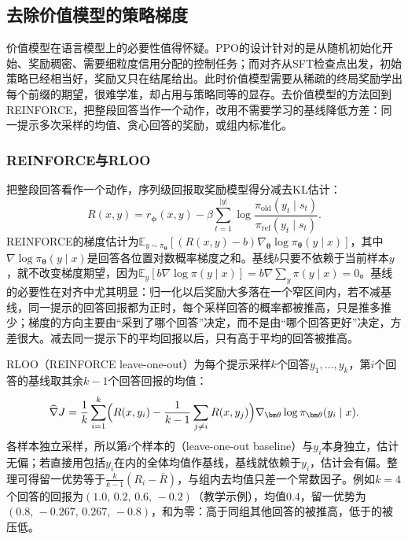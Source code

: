 \subsection{去除价值模型的策略梯度}
\label{sec:nlp-align-critic-free}

价值模型在语言模型上的必要性值得怀疑。PPO的设计针对的是从随机初始化开始、奖励稠密、需要细粒度信用分配的控制任务；而对齐从SFT检查点出发，初始策略已经相当好，奖励又只在结尾给出。此时价值模型需要从稀疏的终局奖励学出每个前缀的期望，很难学准，却占用与策略同等的显存。去价值模型的方法回到REINFORCE，把整段回答当作一个动作，改用不需要学习的基线降低方差：同一提示多次采样的均值、贪心回答的奖励，或组内标准化。

\subsubsection{REINFORCE与RLOO}
\label{sec:nlp-align-rloo}

把整段回答看作一个动作，序列级回报取奖励模型得分减去KL估计：
\[
 R(x,y)=r_{\bm\phi}(x,y)-\beta\sum_{t=1}^{|y|}\log\frac{\pi_{\mathrm{old}}(y_t\mid s_t)}{\pi_{\mathrm{ref}}(y_t\mid s_t)}.
\]
REINFORCE的梯度估计为$\mathbb E_{y\sim\pi_{\bm\theta}}[(R(x,y)-b)\nabla_{\bm\theta}\log\pi_{\bm\theta}(y\mid x)]$，其中$\nabla\log\pi_{\bm\theta}(y\mid x)$是回答各位置对数概率梯度之和。基线$b$只要不依赖于当前样本$y$，就不改变梯度期望，因为$\mathbb E_y[b\nabla\log\pi(y\mid x)]=b\nabla\sum_y\pi(y\mid x)=0$。基线的必要性在对齐中尤其明显：归一化以后奖励大多落在一个窄区间内，若不减基线，同一提示的回答回报都为正时，每个采样回答的概率都被推高，只是推多推少；梯度的方向主要由“采到了哪个回答”决定，而不是由“哪个回答更好”决定，方差很大。减去同一提示下的平均回报以后，只有高于平均的回答被推高。

RLOO（REINFORCE leave-one-out）为每个提示采样$k$个回答$y_1,\ldots,y_k$，第$i$个回答的基线取其余$k-1$个回答回报的均值\cite{nlp-align-kool2019buy,nlp-align-ahmadian2024back}：
\begin{equation}
\label{eq:nlp-align-rloo}
 \widehat{\nabla}J=\frac1k\sum_{i=1}^{k}\Bigl(R(x,y_i)-\frac{1}{k-1}\sum_{j\ne i}R(x,y_j)\Bigr)\nabla_{\bm\theta}\log\pi_{\bm\theta}(y_i\mid x).
\end{equation}
各样本独立采样，所以第$i$个样本的（leave-one-out baseline）与$y_i$本身独立，估计无偏；若直接用包括$y_i$在内的全体均值作基线，基线就依赖于$y_i$，估计会有偏。整理可得留一优势等于$\frac{k}{k-1}(R_i-\bar R)$，与组内去均值只差一个常数因子。例如$k=4$个回答的回报为$(1.0,\,0.2,\,0.6,\,-0.2)$（教学示例），均值$0.4$，留一优势为$(0.8,\,-0.267,\,0.267,\,-0.8)$，和为零：高于同组其他回答的被推高，低于的被压低。

